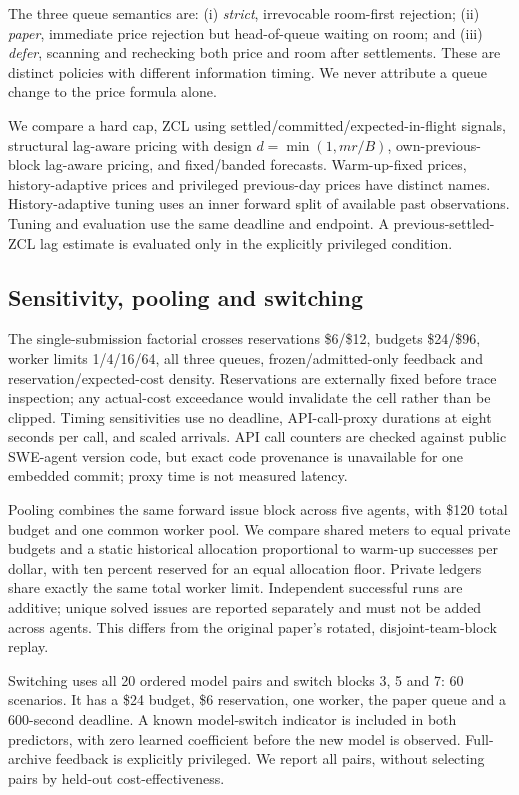 \documentclass[11pt]{article}
\begin{document}
The three queue semantics are: (i) \emph{strict}, irrevocable room-first rejection; (ii) \emph{paper}, immediate price rejection but head-of-queue waiting on room; and (iii) \emph{defer}, scanning and rechecking both price and room after settlements. These are distinct policies with different information timing. We never attribute a queue change to the price formula alone.

We compare a hard cap, ZCL using settled/committed/expected-in-flight signals, structural lag-aware pricing with design $d=\min(1,mr/B)$, own-previous-block lag-aware pricing, and fixed/banded forecasts. Warm-up-fixed prices, history-adaptive prices and privileged previous-day prices have distinct names. History-adaptive tuning uses an inner forward split of available past observations. Tuning and evaluation use the same deadline and endpoint. A previous-settled-ZCL lag estimate is evaluated only in the explicitly privileged condition.

\subsection{Sensitivity, pooling and switching}
The single-submission factorial crosses reservations \$6/\$12, budgets \$24/\$96, worker limits 1/4/16/64, all three queues, frozen/admitted-only feedback and reservation/expected-cost density. Reservations are externally fixed before trace inspection; any actual-cost exceedance would invalidate the cell rather than be clipped. Timing sensitivities use no deadline, API-call-proxy durations at eight seconds per call, and scaled arrivals. API call counters are checked against public SWE-agent version code, but exact code provenance is unavailable for one embedded commit; proxy time is not measured latency.

Pooling combines the same forward issue block across five agents, with \$120 total budget and one common worker pool. We compare shared meters to equal private budgets and a static historical allocation proportional to warm-up successes per dollar, with ten percent reserved for an equal allocation floor. Private ledgers share exactly the same total worker limit. Independent successful runs are additive; unique solved issues are reported separately and must not be added across agents. This differs from the original paper's rotated, disjoint-team-block replay.

Switching uses all 20 ordered model pairs and switch blocks 3, 5 and 7: 60 scenarios. It has a \$24 budget, \$6 reservation, one worker, the paper queue and a 600-second deadline. A known model-switch indicator is included in both predictors, with zero learned coefficient before the new model is observed. Full-archive feedback is explicitly privileged. We report all pairs, without selecting pairs by held-out cost-effectiveness.
\end{document}
